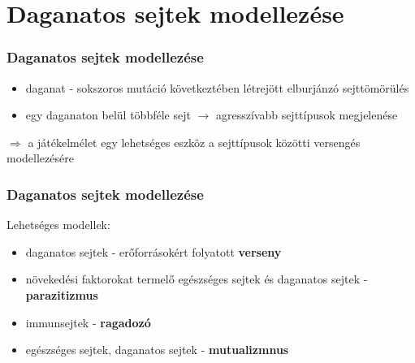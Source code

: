\section{Daganatos sejtek modellezése}
\begin{frame}
\frametitle{Daganatos sejtek modellezése}
\begin{itemize}
	\item daganat - sokszoros mutáció következtében létrejött elburjánzó sejttömörülés
	\item egy daganaton belül többféle sejt $\rightarrow$ agresszívabb sejttípusok megjelenése
\end{itemize}
	\begin{block}{}
	$\Rightarrow$ a játékelmélet egy lehetséges eszköz a sejttípusok közötti versengés modellezésére
\end{block}

\end{frame}

\begin{frame}
	\frametitle{Daganatos sejtek modellezése}
	Lehetséges modellek:
	\begin{itemize}
		\item daganatos sejtek - erőforrásokért folyatott \textbf{verseny}
		\item növekedési faktorokat termelő egészséges sejtek és daganatos sejtek - \textbf{parazitizmus}
		\item immunsejtek - \textbf{ragadozó}
		\item egészséges sejtek, daganatos sejtek - \textbf{mutualizmnus}
	\end{itemize}

\end{frame}

